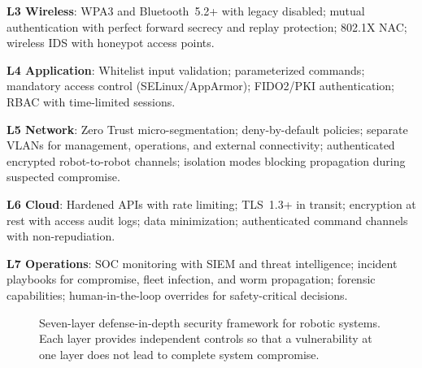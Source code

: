 \documentclass[journal]{IEEEtran}
\begin{document}
\textbf{L3 Wireless}: WPA3 and Bluetooth~5.2+ with legacy disabled; mutual authentication
with perfect forward secrecy and replay protection; 802.1X NAC; wireless IDS with
honeypot access points.

\textbf{L4 Application}: Whitelist input validation; parameterized commands; mandatory
access control (SELinux/AppArmor); FIDO2/PKI authentication; RBAC with time-limited
sessions.

\textbf{L5 Network}: Zero Trust micro-segmentation; deny-by-default policies; separate
VLANs for management, operations, and external connectivity; authenticated encrypted
robot-to-robot channels; isolation modes blocking propagation during suspected compromise.

\textbf{L6 Cloud}: Hardened APIs with rate limiting; TLS~1.3+ in transit; encryption at
rest with access audit logs; data minimization; authenticated command channels with
non-repudiation.

\textbf{L7 Operations}: SOC monitoring with SIEM and threat intelligence; incident
playbooks for compromise, fleet infection, and worm propagation; forensic capabilities;
human-in-the-loop overrides for safety-critical decisions.

\begin{figure}[!t]
\centering
{}
\caption{Seven-layer defense-in-depth security framework for robotic systems.
  Each layer provides independent controls so that a vulnerability at one layer
  does not lead to complete system compromise.}
\label{fig:defense_framework}
\end{figure}
\end{document}

